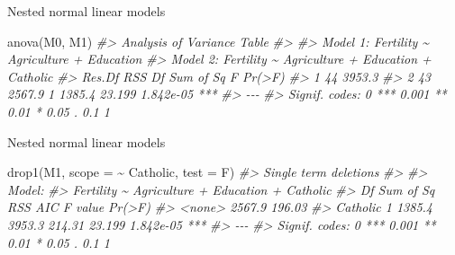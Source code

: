 \documentclass[
  10pt,
  ignorenonframetext,
]{beamer}
\newenvironment{Shaded}{\begin{snugshade}}{\end{snugshade}}
\newcommand{\AttributeTok}[1]{\textcolor[rgb]{0.77,0.63,0.00}{#1}}
\newcommand{\CommentTok}[1]{\textcolor[rgb]{0.56,0.35,0.01}{\textit{#1}}}
\newcommand{\FunctionTok}[1]{\textcolor[rgb]{0.00,0.00,0.00}{#1}}
\newcommand{\NormalTok}[1]{#1}
\newcommand{\SpecialCharTok}[1]{\textcolor[rgb]{0.00,0.00,0.00}{#1}}
\newcommand{\StringTok}[1]{\textcolor[rgb]{0.31,0.60,0.02}{#1}}
\begin{document}
\begin{frame}[fragile]{Nested normal linear models}
\protect\hypertarget{nested-normal-linear-models-4}{}
\begin{Shaded}
\begin{Highlighting}[]
\FunctionTok{anova}\NormalTok{(M0, M1)}
\CommentTok{\#\textgreater{} Analysis of Variance Table}
\CommentTok{\#\textgreater{} }
\CommentTok{\#\textgreater{} Model 1: Fertility \textasciitilde{} Agriculture + Education}
\CommentTok{\#\textgreater{} Model 2: Fertility \textasciitilde{} Agriculture + Education + Catholic}
\CommentTok{\#\textgreater{}   Res.Df    RSS Df Sum of Sq      F    Pr(\textgreater{}F)    }
\CommentTok{\#\textgreater{} 1     44 3953.3                                  }
\CommentTok{\#\textgreater{} 2     43 2567.9  1    1385.4 23.199 1.842e{-}05 ***}
\CommentTok{\#\textgreater{} {-}{-}{-}}
\CommentTok{\#\textgreater{} Signif. codes:  0 \textquotesingle{}***\textquotesingle{} 0.001 \textquotesingle{}**\textquotesingle{} 0.01 \textquotesingle{}*\textquotesingle{} 0.05 \textquotesingle{}.\textquotesingle{} 0.1 \textquotesingle{} \textquotesingle{} 1}
\end{Highlighting}
\end{Shaded}
\end{frame}

\begin{frame}[fragile]{Nested normal linear models}
\protect\hypertarget{nested-normal-linear-models-5}{}
\begin{Shaded}
\begin{Highlighting}[]
\FunctionTok{drop1}\NormalTok{(M1, }\AttributeTok{scope =} \SpecialCharTok{\textasciitilde{}}\NormalTok{ Catholic, }\AttributeTok{test =} \StringTok{\textquotesingle{}F\textquotesingle{}}\NormalTok{)}
\CommentTok{\#\textgreater{} Single term deletions}
\CommentTok{\#\textgreater{} }
\CommentTok{\#\textgreater{} Model:}
\CommentTok{\#\textgreater{} Fertility \textasciitilde{} Agriculture + Education + Catholic}
\CommentTok{\#\textgreater{}          Df Sum of Sq    RSS    AIC F value    Pr(\textgreater{}F)    }
\CommentTok{\#\textgreater{} \textless{}none\textgreater{}                2567.9 196.03                      }
\CommentTok{\#\textgreater{} Catholic  1    1385.4 3953.3 214.31  23.199 1.842e{-}05 ***}
\CommentTok{\#\textgreater{} {-}{-}{-}}
\CommentTok{\#\textgreater{} Signif. codes:  0 \textquotesingle{}***\textquotesingle{} 0.001 \textquotesingle{}**\textquotesingle{} 0.01 \textquotesingle{}*\textquotesingle{} 0.05 \textquotesingle{}.\textquotesingle{} 0.1 \textquotesingle{} \textquotesingle{} 1}
\end{Highlighting}
\end{Shaded}
\end{frame}
\end{document}
